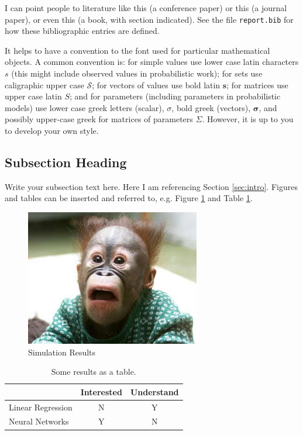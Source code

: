 \documentclass[11point]{article}
\renewcommand{\vec}[1]{\boldsymbol{\mathbf{#1}}}
\begin{document}
I can point people to literature like this \cite{Mikolov2013} (a conference paper) or this \cite{Fawcett2006} (a journal paper), or even this \cite[Sec. 4.1]{Bishop2006} (a book, with section indicated). See the file \texttt{report.bib} for how these bibliographic entries are defined.

It helps to have a convention to the font used for particular mathematical objects. A common convention is: for simple values use lower case latin characters $s$ (this might include observed values in probabilistic work); for sets use caligraphic upper case $\mathcal{S}$; for vectors of values use bold latin $\vec{s}$; for matrices use upper case latin $S$; and for parameters (including parameters in probabilistic models) use lower case greek letters (scalar), $\sigma$, bold greek (vectors), $\vec{\sigma}$, and possibly upper-case greek for matrices of parameters $\Sigma$. However, it is up to you to develop your own style.

\subsection{Subsection Heading}
Write your subsection text here. Here I am referencing Section \ref{sec:intro}. Figures and tables can be inserted and referred to, e.g. Figure \ref{fig:simulation_figure} and Table \ref{tbl:results_table}.

\begin{figure}
    \centering
    \includegraphics[width=3.0in]{figures/myfigure.jpg}
    \caption{Simulation Results}
    \label{fig:simulation_figure}
\end{figure}

\begin{table}[htb]
  \centering
  \begin{tabular}{lcc}
  \toprule
  & Interested & Understand \\
  \midrule
  Linear Regression & N & Y \\
  Neural Networks & Y & N \\
  \bottomrule
  \end{tabular}
  \caption{Some results as a table.}
  \label{tbl:results_table}
\end{table}
\end{document}
